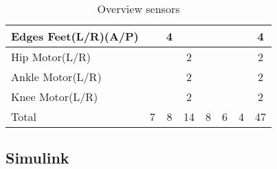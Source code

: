 \begin{table}[]
\begin{tabular}{|l|c|c|c|c|c|c|c|}
		Edges Feet(L/R)(A/P)  &                          & 4                                     &                                     &                                      &                                    &                                          & 4                          \\ \hline
		Hip Motor(L/R)        &                          &                                       & 2                                   &                                      &                                    &                                          & 2                          \\ \hline
		Ankle Motor(L/R)      &                          &                                       & 2                                   &                                      &                                    &                                          & 2                          \\ \hline
		Knee Motor(L/R)       &                          &                                       & 2                                   &                                      &                                    &                                          & 2                          \\ \hline
		Total                 & 7                        & 8                                     & 14                                  & 8                                    & 6                                  & 4                                        & 47                         \\ \hline
	\end{tabular}
	\caption{Overview sensors}
	\label{my-label}
\end{table}

\subsection{Simulink}